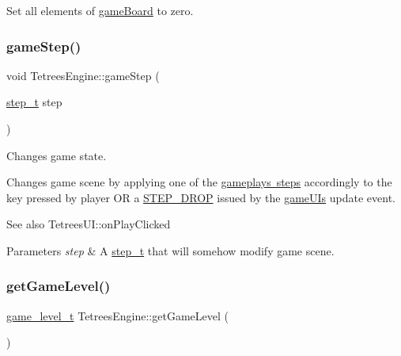 Set all elements of \mbox{\hyperlink{classTetreesEngine_a37d082a7816d6731b2703dd6d1a1cb97}{game\+Board}} to zero. \mbox{\label{classTetreesEngine_a33e9983a618b3538640b6bd987304b8b}} 
\subsubsection{\texorpdfstring{game\+Step()}{gameStep()}}
{\footnotesize\ttfamily void Tetrees\+Engine\+::game\+Step (\begin{DoxyParamCaption}\item[{\mbox{\hyperlink{TetreesDefs_8hpp_a4d5a793092a473f85b4c1f7faf62afed}{step\+\_\+t}}}]{step }\end{DoxyParamCaption})}



Changes game state. 

Changes game scene by applying one of the \mbox{\hyperlink{TetreesDefs_8hpp_a4d5a793092a473f85b4c1f7faf62afed}{gameplay\textquotesingle{}s steps}} accordingly to the key pressed by player OR a \mbox{\hyperlink{TetreesDefs_8hpp_a4d5a793092a473f85b4c1f7faf62afed}{S\+T\+E\+P\+\_\+\+D\+R\+OP}} issued by the \mbox{\hyperlink{classTetreesEngine_a01bf1d438236d5f57129ffb22adf59ce}{game\+UI\textquotesingle{}s}} update event. \begin{DoxySeeAlso}{See also}
Tetrees\+U\+I\+::on\+Play\+Clicked 
\end{DoxySeeAlso}

\begin{DoxyParams}{Parameters}
{\em step} & A \mbox{\hyperlink{TetreesDefs_8hpp_a4d5a793092a473f85b4c1f7faf62afed}{step\+\_\+t}} that will somehow modify game scene. \\
\hline
\end{DoxyParams}
\mbox{\label{classTetreesEngine_a7ad503b48ba753c446e5438ca67aa4e3}} 
\subsubsection{\texorpdfstring{get\+Game\+Level()}{getGameLevel()}}
{\footnotesize\ttfamily \mbox{\hyperlink{structgame__level__t}{game\+\_\+level\+\_\+t}} Tetrees\+Engine\+::get\+Game\+Level (\begin{DoxyParamCaption}{ }\end{DoxyParamCaption})}

